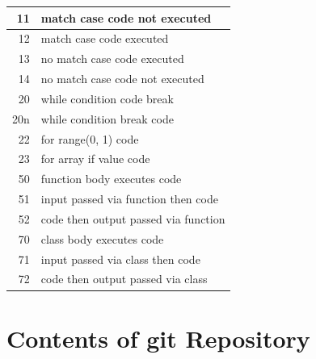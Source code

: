 \begin{appendices}
\begin{table}[H]
\begin{tabular}{|r|l|}
 11 & match case code not executed \\
\hline
 12 & match case code executed \\
\hline
 13 & no match case code executed \\
\hline
 14 & no match case code not executed \\
\hline

20 & while condition code break \\
\hline
20n & while condition break code \\
\hline
22 & for range(0, 1) code \\
\hline
23 & for array if value code \\
\hline

50 & function body executes code \\
\hline
51 & input passed via function then code \\
\hline
52 & code then output passed via function \\
\hline

70 & class body executes code \\
\hline
71 & input passed via class then code \\
\hline
72 & code then output passed via class \\
\hline
\end{tabular}
\label{tab:complexity IDs for Python}
\end{table}

\clearpage

\section{Contents of git Repository}
\label{gitContent}


\end{appendices}
